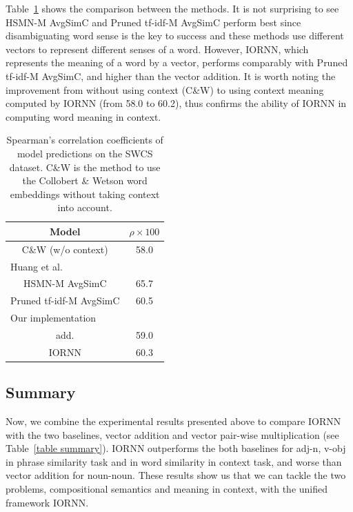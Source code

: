 \documentclass[11pt]{article}
\begin{document}
Table~\ref{table swsc result} shows the comparison between the methods.
It is not surprising to see HSMN-M AvgSimC and Pruned tf-idf-M AvgSimC perform best since disambiguating
word sense is the key to success and these methods use different vectors to represent different senses of a word.
However, IORNN, which represents the meaning of a word by a vector, performs comparably 
with Pruned tf-idf-M AvgSimC, and higher than the vector addition. It is worth noting the improvement from 
without using context (C\&W) to using context meaning computed by IORNN (from 58.0 to 60.2), thus 
confirms the ability of IORNN in computing word meaning in context.

\begin{table}[!ht]
	\center
	\begin{tabular}{cc}
		\hline
		Model & $\rho \times 100$ \\ \hline \hline

		C\&W (w/o context) & 58.0 \\ \hline
		
		\multicolumn{2}{l}{Huang et al.} \\
		HSMN-M AvgSimC & 65.7 \\ 
		Pruned tf-idf-M AvgSimC & 60.5 \\ \hline 
		
		\multicolumn{2}{l}{Our implementation} \\
		add. & 59.0 \\
		IORNN & 60.3 \\ \hline
		
	\end{tabular}
	\caption{Spearman's correlation coefficients of model predictions on the SWCS dataset.
	C\&W is the method to use the Collobert \& Wetson word embeddings without taking context into account. }
	\label{table swsc result}
\end{table}


 

\subsection{Summary} 

Now, we combine the experimental results presented above to compare IORNN 
with the two baselines, vector addition and vector pair-wise multiplication 
(see Table~\ref{table summary}). IORNN outperforms the both baselines for adj-n, v-obj
in phrase similarity task and in word similarity in context task, 
and worse than vector addition for noun-noun. These results show us that we can 
tackle the two problems, compositional semantics and meaning in context, with the unified framework 
IORNN.
\end{document}
